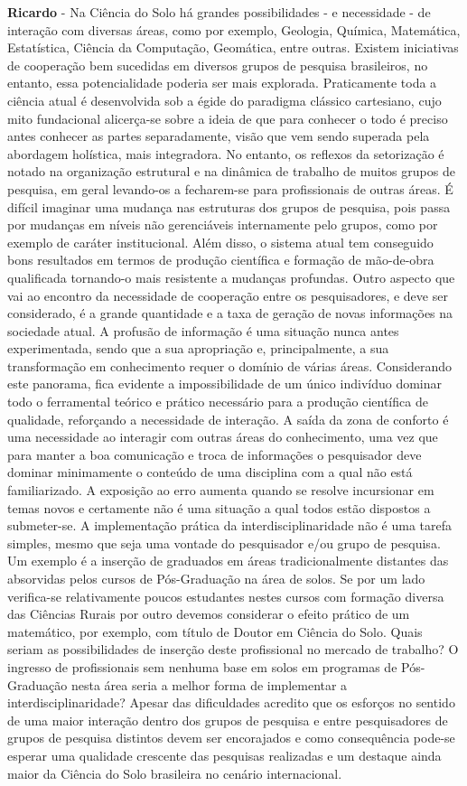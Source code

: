\textbf{Ricardo} - Na Ciência do Solo há grandes possibilidades - e necessidade - de interação com diversas áreas, como por exemplo, Geologia, Química, Matemática, Estatística, Ciência da Computação, Geomática, entre outras. Existem iniciativas de cooperação bem sucedidas  em diversos grupos de pesquisa brasileiros, no entanto, essa potencialidade poderia ser mais explorada. Praticamente toda a ciência atual é desenvolvida sob a égide do paradigma clássico cartesiano, cujo mito fundacional alicerça-se sobre a ideia de que para conhecer o todo é preciso antes conhecer as partes separadamente, visão que vem sendo superada pela abordagem holística, mais integradora. No entanto, os reflexos da setorização é notado na organização estrutural e na dinâmica de trabalho de muitos grupos de pesquisa, em geral levando-os a fecharem-se para profissionais de outras áreas. É difícil imaginar uma mudança nas estruturas dos grupos de pesquisa, pois passa por mudanças em níveis não gerenciáveis internamente pelo grupos, como por exemplo de caráter institucional. Além disso, o sistema atual tem conseguido bons resultados em termos de produção científica e formação de mão-de-obra qualificada tornando-o mais resistente a mudanças profundas. Outro aspecto que vai ao encontro da necessidade de cooperação entre os pesquisadores, e deve ser considerado, é a grande quantidade e a taxa de geração de novas informações na sociedade atual. A profusão de informação é uma situação nunca antes experimentada, sendo que a sua apropriação e, principalmente, a sua transformação em conhecimento requer o domínio de várias áreas. Considerando este panorama, fica evidente a impossibilidade de um único indivíduo dominar todo o ferramental teórico e prático necessário para a produção científica de qualidade, reforçando a necessidade de interação. A saída da zona de conforto é uma necessidade ao interagir com outras áreas do conhecimento, uma vez que para manter a boa comunicação e troca de informações o pesquisador deve dominar minimamente o conteúdo de uma disciplina com a qual não está familiarizado. A exposição ao erro aumenta quando se resolve incursionar em temas novos e certamente não é uma situação a qual todos estão dispostos a submeter-se. A implementação prática da interdisciplinaridade não é uma tarefa simples, mesmo que seja uma vontade do pesquisador e/ou grupo de pesquisa. Um exemplo é a inserção de graduados em áreas tradicionalmente distantes das absorvidas pelos cursos de Pós-Graduação na área de solos. Se por um lado verifica-se relativamente poucos estudantes nestes cursos com formação diversa das Ciências Rurais por outro devemos considerar o efeito prático de um matemático, por exemplo, com título de Doutor em Ciência do Solo. Quais seriam as possibilidades de inserção deste profissional no mercado de trabalho? O ingresso de profissionais sem nenhuma base em solos em programas de Pós-Graduação nesta área seria a melhor forma de implementar a interdisciplinaridade? Apesar das dificuldades acredito que os esforços no sentido de uma maior interação dentro dos grupos de pesquisa e entre pesquisadores de grupos de pesquisa distintos devem ser encorajados e como consequência pode-se esperar uma  qualidade crescente das pesquisas realizadas e um destaque ainda maior da Ciência do Solo brasileira no cenário internacional.\\
